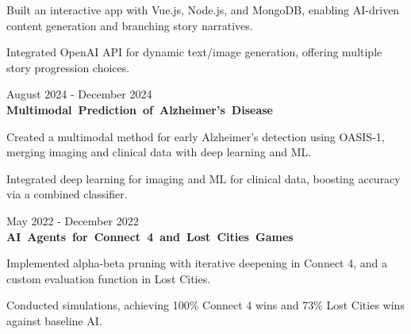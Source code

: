 \documentclass[10pt, letterpaper]{article}
\begin{document}
\begin{onecolentry}
    \begin{highlightsforbulletentries}
        \item Built an interactive app with Vue.js, Node.js, and MongoDB, enabling AI-driven content generation and branching story narratives.
        \item Integrated OpenAI API for dynamic text/image generation, offering multiple story progression choices.
    \end{highlightsforbulletentries}
\end{onecolentry}

\vspace{\entrySpacing}
\begin{twocolentry}{August 2024 - December 2024}
    \mbox{\textbf{Multimodal Prediction of Alzheimer's Disease}}
\end{twocolentry}

\begin{onecolentry}
    \begin{highlightsforbulletentries}
        \item Created a multimodal method for early Alzheimer's detection using OASIS-1, merging imaging and clinical data with deep learning and ML.
        \item Integrated deep learning for imaging and ML for clinical data, boosting accuracy via a combined classifier.
    \end{highlightsforbulletentries}
\end{onecolentry}

\vspace{\entrySpacing}
\begin{twocolentry}{May 2022 - December 2022}
    \mbox{\textbf{AI Agents for Connect 4 and Lost Cities Games}}
\end{twocolentry}

\begin{onecolentry}
    \begin{highlightsforbulletentries}
        \item Implemented alpha-beta pruning with iterative deepening in Connect 4, and a custom evaluation function in Lost Cities.
        \item Conducted simulations, achieving 100\% Connect 4 wins and 73\% Lost Cities wins against baseline AI.
    \end{highlightsforbulletentries}
\end{onecolentry}
\end{document}
